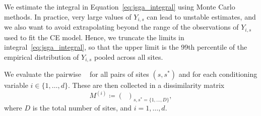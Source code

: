 \documentclass[12pt]{article}
\newcommand{\eJSGa}[1]{\mathop{\mathrm{eJS}_{i, #1}^{\mathrm{G}_{\lambda}}}\nolimits}
\newcommand\numberthis{\addtocounter{equation}{1}\tag{\theequation}}
\begin{document}
We estimate the integral in Equation~\eqref{eq:jsga_integral} using Monte Carlo methods.%
In practice, very large values of $Y_{i, s}$ can lead to unstable estimates, and we also want to avoid extrapolating beyond the range of the observations of $Y_{i, s}$ used to fit the CE model. 
Hence, we truncate the limits in integral~\eqref{eq:jsga_integral}, so that the upper limit is the 99th percentile of the empirical distribution of $Y_{i, s}$ pooled across all sites. 

We evaluate the pairwise $\eJSGa{s, s^*}$ for all pairs of sites $(s, s^*)$ and for each conditioning variable $i \in \{1, \ldots, d\}$. 
These are then collected in a dissimilarity matrix
\begin{equation} \label{eq:distance_matrix}
  M^{(i)} \coloneq \left(\eJSGa{s, s^*} \right)_{s, s^* = \{1, \ldots, D\}},
\end{equation}
where $D$ is the total number of sites, and $i = 1, \ldots, d$.
\end{document}
